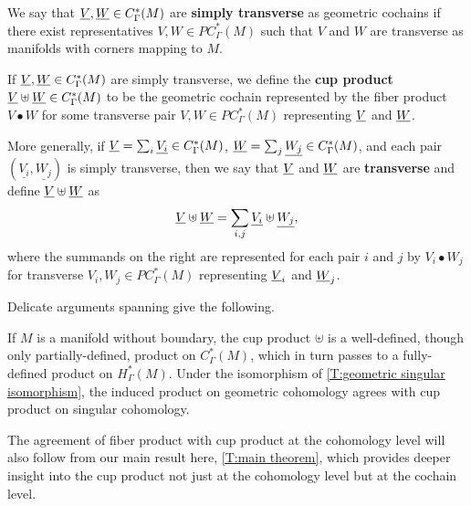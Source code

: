 \begin{definition}\label{D:cochain trans}
	We say that $\underline{V}, \underline{W} \in C^*_{\Gamma}(M)$ are \textbf{simply transverse} as geometric cochains if there exist representatives $V,W \in PC^*_\Gamma(M)$ such that $V$ and $W$ are transverse as manifolds with corners mapping to $M$.

	If $\underline{V}, \underline{W} \in C^*_{\Gamma}(M)$ are simply transverse, we define the \textbf{cup product} $\underline{V} \uplus \underline{W} \in C^*_\Gamma(M)$ to be the geometric cochain represented by the fiber product $V \bullet W$ for some transverse pair $V,W \in PC^*_\Gamma(M)$ representing $\underline{V}$ and $\underline{W}$.

	More generally, if $\underline{V} = \sum_i \underline{V_i} \in C_\Gamma^*(M)$, $\underline{W} = \sum_j \underline{W_j} \in C_\Gamma^*(M)$, and each pair $(\underline{V_i},\underline{W_j})$ is simply transverse, then
	we say that $\underline{V}$ and $\underline{W}$ are \textbf{transverse} and define $\underline{V}\uplus\underline{W}$ as
	$$\underline{V}\uplus\underline{W} = \sum_{i,j} \underline{V_i}\uplus \underline{W_j},$$
	where the summands on the right are represented for each pair $i$ and $j$ by $V_i \bullet W_j$ for transverse $V_i, W_j \in PC^*_\Gamma(M)$ representing $\underline{V}_i$ and $\underline{W}_j$.
\end{definition}

Delicate arguments spanning \cite[Theorems 7.9, 7.14, 7.22, and 7.29]{medina2022foundations} give the following.

\begin{theorem}\label{P:product}
	If $M$ is a manifold without boundary, the cup product $\uplus$ is a well-defined, though only partially-defined, product on $C_\Gamma^*(M)$, which in turn passes to a fully-defined product on $H_\Gamma^*(M)$.
	Under the isomorphism of \cref{T:geometric singular isomorphism}, the induced product on geometric cohomology agrees with cup product on singular cohomology.
\end{theorem}

The agreement of fiber product with cup product at the cohomology level will also follow from our main result here, \cref{T:main theorem}, which provides deeper insight into the cup product not just at the cohomology level but at the cochain level.